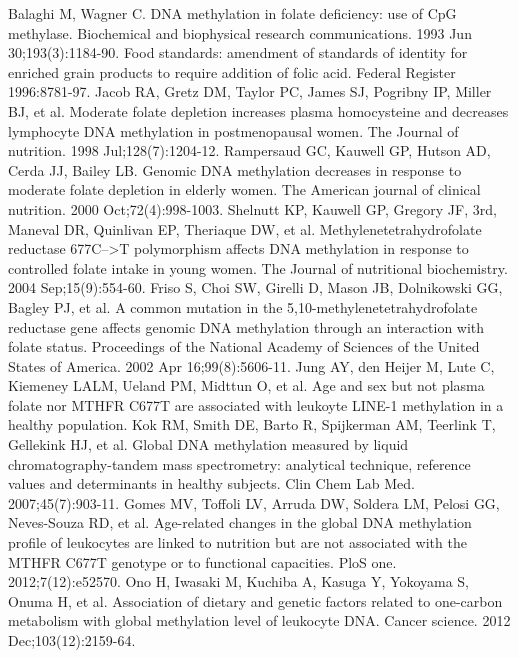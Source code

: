 \begin{thebibliography}{12}
		Balaghi M, Wagner C. DNA methylation in folate deficiency: use of CpG methylase. Biochemical and biophysical research communications. 1993 Jun 30;193(3):1184-90.
		Food standards: amendment of standards of identity for enriched grain products to require addition of folic acid.  Federal Register 1996:8781-97.
		Jacob RA, Gretz DM, Taylor PC, James SJ, Pogribny IP, Miller BJ, et al. Moderate folate depletion increases plasma homocysteine and decreases lymphocyte DNA methylation in postmenopausal women. The Journal of nutrition. 1998 Jul;128(7):1204-12.
		Rampersaud GC, Kauwell GP, Hutson AD, Cerda JJ, Bailey LB. Genomic DNA methylation decreases in response to moderate folate depletion in elderly women. The American journal of clinical nutrition. 2000 Oct;72(4):998-1003.
		Shelnutt KP, Kauwell GP, Gregory JF, 3rd, Maneval DR, Quinlivan EP, Theriaque DW, et al. Methylenetetrahydrofolate reductase 677C-->T polymorphism affects DNA methylation in response to controlled folate intake in young women. The Journal of nutritional biochemistry. 2004 Sep;15(9):554-60.
		Friso S, Choi SW, Girelli D, Mason JB, Dolnikowski GG, Bagley PJ, et al. A common mutation in the 5,10-methylenetetrahydrofolate reductase gene affects genomic DNA methylation through an interaction with folate status. Proceedings of the National Academy of Sciences of the United States of America. 2002 Apr 16;99(8):5606-11.
		Jung AY, den Heijer M, Lute C, Kiemeney LALM, Ueland PM, Midttun O, et al. Age and sex but not plasma folate nor MTHFR C677T are associated with leukoyte LINE-1 methylation in a healthy population.
		Kok RM, Smith DE, Barto R, Spijkerman AM, Teerlink T, Gellekink HJ, et al. Global DNA methylation measured by liquid chromatography-tandem mass spectrometry: analytical technique, reference values and determinants in healthy subjects. Clin Chem Lab Med. 2007;45(7):903-11.
		Gomes MV, Toffoli LV, Arruda DW, Soldera LM, Pelosi GG, Neves-Souza RD, et al. Age-related changes in the global DNA methylation profile of leukocytes are linked to nutrition but are not associated with the MTHFR C677T genotype or to functional capacities. PloS one. 2012;7(12):e52570.
		Ono H, Iwasaki M, Kuchiba A, Kasuga Y, Yokoyama S, Onuma H, et al. Association of dietary and genetic factors related to one-carbon metabolism with global methylation level of leukocyte DNA. Cancer science. 2012 Dec;103(12):2159-64.

\end{thebibliography}
